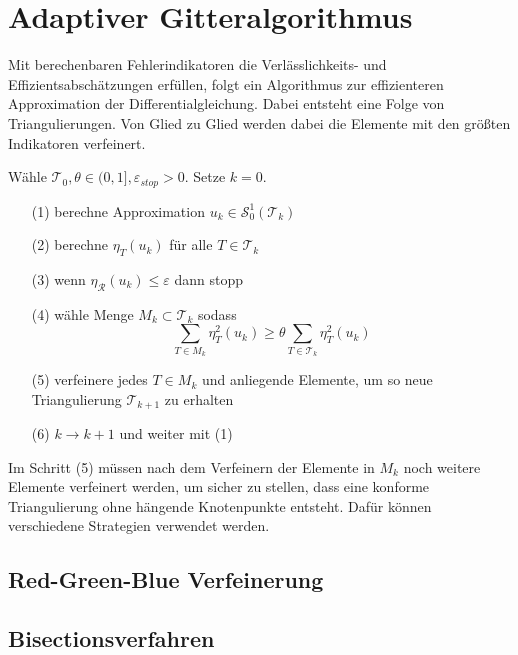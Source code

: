\chapter{Adaptiver Gitteralgorithmus}
Mit berechenbaren Fehlerindikatoren die Verlässlichkeits- und Effizientsabschätzungen erfüllen, folgt ein Algorithmus zur effizienteren Approximation der Differentialgleichung. Dabei entsteht eine Folge von Triangulierungen. Von Glied zu Glied werden dabei die Elemente mit den größten Indikatoren verfeinert.
\begin{algorithmus}
	Wähle $\mathscr{T}_0, \theta\in (0,1],\varepsilon_{stop}>0$. Setze $k=0$.
	\begin{itemize}
		\item[(1)] berechne Approximation $u_k\in\mathscr{S}_0^1(\mathscr{T}_k)$
		\item[(2)] berechne $\eta_T(u_k)$ für alle $T\in\mathscr{T}_k$
		\item[(3)] wenn $\eta_{\mathscr{R}}(u_k) \leq \varepsilon$ dann stopp
		\item[(4)] wähle Menge $M_k\subset\mathscr{T}_k$ sodass
		\[ \sum_{T\in M_k} \eta_T^2(u_k) \geq \theta\sum_{T\in\mathscr{T}_k}\eta_T^2(u_k)\]
		\item[(5)] verfeinere jedes $T\in M_k$ und anliegende Elemente, um so neue Triangulierung $\mathscr{T}_{k+1}$ zu erhalten
		\item[(6)] $k \rightarrow k + 1$ und weiter mit (1)
	\end{itemize}
\end{algorithmus}
Im Schritt (5) müssen nach dem Verfeinern der Elemente in $M_k$ noch weitere Elemente verfeinert werden, um sicher zu stellen, dass eine konforme Triangulierung ohne hängende Knotenpunkte entsteht. Dafür können verschiedene Strategien verwendet werden.
\section{Red-Green-Blue Verfeinerung}
\section{Bisectionsverfahren}